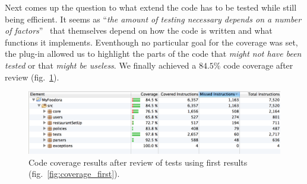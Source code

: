 Next comes up the question to what extend the code has to be tested
while still being efficient.
It seems as ``\textit{the amount of testing necessary depends on a number of
factors}''~\cite{artimaHowMuchCoverage} that themselves depend
on how the code is written and what functions it implements.
Eventhough no particular goal for the coverage was set,
the plug-in allowed us to highlight the parts of the code that \emph{might not have been tested}
or that \emph{might be useless}. We finally achieved a $84.5\%$ code coverage after review (fig.~\ref{fig:coverage_end}).

\begin{figure}[h]
  \begin{center}
    \includegraphics[scale=0.47]{./img/coverage_end.png} 
  \end{center}
  \caption{Code coverage results after review of
  tests using first results (fig.~\ref{fig:coverage_first}).}
  \label{fig:coverage_end}
\end{figure}

